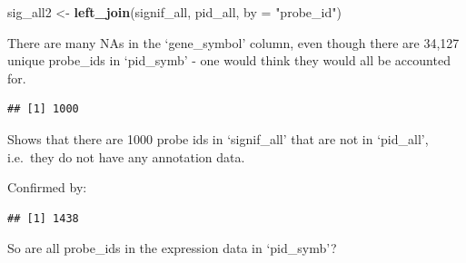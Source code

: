 \documentclass[]{article}
\newenvironment{Shaded}{\begin{snugshade}}{\end{snugshade}}
\newcommand{\KeywordTok}[1]{\textcolor[rgb]{0.13,0.29,0.53}{\textbf{#1}}}
\newcommand{\DataTypeTok}[1]{\textcolor[rgb]{0.13,0.29,0.53}{#1}}
\newcommand{\StringTok}[1]{\textcolor[rgb]{0.31,0.60,0.02}{#1}}
\newcommand{\OperatorTok}[1]{\textcolor[rgb]{0.81,0.36,0.00}{\textbf{#1}}}
\newcommand{\NormalTok}[1]{#1}
\begin{document}
\begin{Shaded}
\begin{Highlighting}[]
\NormalTok{sig_all2 <-}\StringTok{ }\KeywordTok{left_join}\NormalTok{(signif_all, pid_all, }\DataTypeTok{by =} \StringTok{"probe_id"}\NormalTok{)}
\end{Highlighting}
\end{Shaded}

There are many NAs in the `gene\_symbol' column, even though there are
34,127 unique probe\_ids in `pid\_symb' - one would think they would all
be accounted for.

\begin{Shaded}
\end{Shaded}

\begin{verbatim}
## [1] 1000
\end{verbatim}

Shows that there are 1000 probe ids in `signif\_all' that are not in
`pid\_all', i.e.~they do not have any annotation data.

Confirmed by:

\begin{Shaded}
\end{Shaded}

\begin{verbatim}
## [1] 1438
\end{verbatim}

So are all probe\_ids in the expression data in `pid\_symb'?

\begin{Shaded}
\end{Shaded}
\end{document}
